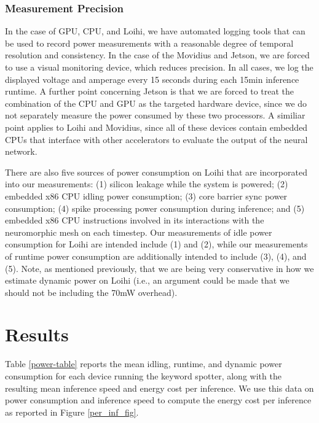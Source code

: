 \documentclass{article}
\begin{document}
\subsubsection{Measurement Precision}

In the case of GPU, CPU, and Loihi, we have automated logging tools that can be used to record power measurements with a reasonable degree of temporal resolution and consistency. In the case of the Movidius and Jetson, we are forced to use a visual monitoring device, which reduces precision. In all cases, we log the displayed voltage and amperage every 15 seconds during each 15min inference runtime. A further point concerning Jetson is that we are forced to treat the combination of the CPU and GPU as the targeted hardware device, since we do not separately measure the power consumed by these two processors. A similiar point applies to Loihi and Movidius, since all of these devices contain embedded CPUs that interface with other accelerators to evaluate the output of the neural network.

There are also five sources of power consumption on Loihi that are incorporated into our measurements: (1) silicon leakage while the system is powered; (2) embedded x86 CPU idling power consumption; (3) core barrier sync power consumption; (4) spike processing power consumption during inference; and (5) embedded x86 CPU instructions involved in its interactions with the neuromorphic mesh on each timestep. Our measurements of idle power consumption for Loihi are intended include (1) and (2), while our measurements of runtime power consumption are additionally intended to include (3), (4), and (5). Note, as mentioned previously, that we are being very conservative in how we estimate dynamic power on Loihi (i.e., an argument could be made that we should not be including the 70mW overhead).

\section{Results} 
 
Table \ref{power-table} reports the mean idling, runtime, and dynamic power consumption for each device running the keyword spotter, along with the resulting mean inference speed and energy cost per inference. We use this data on power consumption and inference speed to compute the energy cost per inference as reported in Figure \ref{per_inf_fig}.
\end{document}
